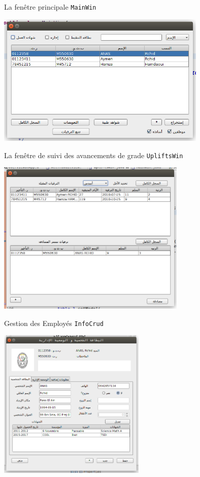 \documentclass[captions=tableheading]{beamer}
\begin{document}
\begin{frame}[fragile,label={sec:org597e26f}]{La fenêtre principale \texttt{MainWin}}
 \begin{center}
\includegraphics[width=10cm]{./diags/MainWin.png}
\end{center}
\end{frame}
\begin{frame}[fragile,label={sec:org494951d}]{La fenêtre de suivi des avancements de grade \texttt{UpliftsWin}}
 \begin{center}
\includegraphics[width=9cm]{./diags/UpliftsWin.png}
\end{center}
\end{frame}

\begin{frame}[fragile,label={sec:org0ba1b6c}]{Gestion des Employés \texttt{InfoCrud}}
 \begin{center}
\includegraphics[width=7cm]{./diags/InfoWin.png}
\end{center}
\end{frame}
\end{document}
